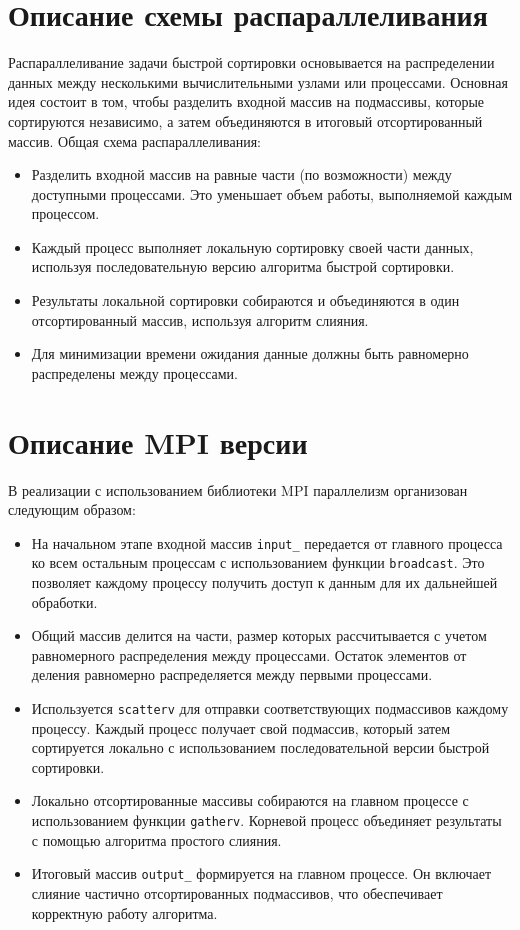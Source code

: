 \documentclass[12pt]{article}
\begin{document}
\section*{Описание схемы распараллеливания}
Распараллеливание задачи быстрой сортировки основывается на распределении данных между несколькими вычислительными узлами или процессами. 
Основная идея состоит в том, чтобы разделить входной массив на подмассивы, которые сортируются независимо, 
а затем объединяются в итоговый отсортированный массив. Общая схема распараллеливания:
\begin{itemize}
    \item Разделить входной массив на равные части (по возможности) между доступными процессами. Это уменьшает объем работы, выполняемой каждым процессом.
    \item Каждый процесс выполняет локальную сортировку своей части данных, используя последовательную версию алгоритма быстрой сортировки.
    \item Результаты локальной сортировки собираются и объединяются в один отсортированный массив, используя алгоритм слияния.
    \item Для минимизации времени ожидания данные должны быть равномерно распределены между процессами.
\end{itemize}

\section*{Описание MPI версии}
В реализации с использованием библиотеки MPI параллелизм организован следующим образом:
\begin{itemize}
    \item На начальном этапе входной массив \texttt{input\_} передается от главного процесса ко всем остальным процессам с использованием функции \texttt{broadcast}. Это позволяет каждому процессу получить доступ к данным для их дальнейшей обработки.
    \item Общий массив делится на части, размер которых рассчитывается с учетом равномерного распределения между процессами. Остаток элементов от деления равномерно распределяется между первыми процессами.
    \item Используется \texttt{scatterv} для отправки соответствующих подмассивов каждому процессу. Каждый процесс получает свой подмассив, который затем сортируется локально с использованием последовательной версии быстрой сортировки.
    \item Локально отсортированные массивы собираются на главном процессе с использованием функции \texttt{gatherv}. Корневой процесс объединяет результаты с помощью алгоритма простого слияния.
    \item Итоговый массив \texttt{output\_} формируется на главном процессе. Он включает слияние частично отсортированных подмассивов, что обеспечивает корректную работу алгоритма.
\end{itemize}
\end{document}
